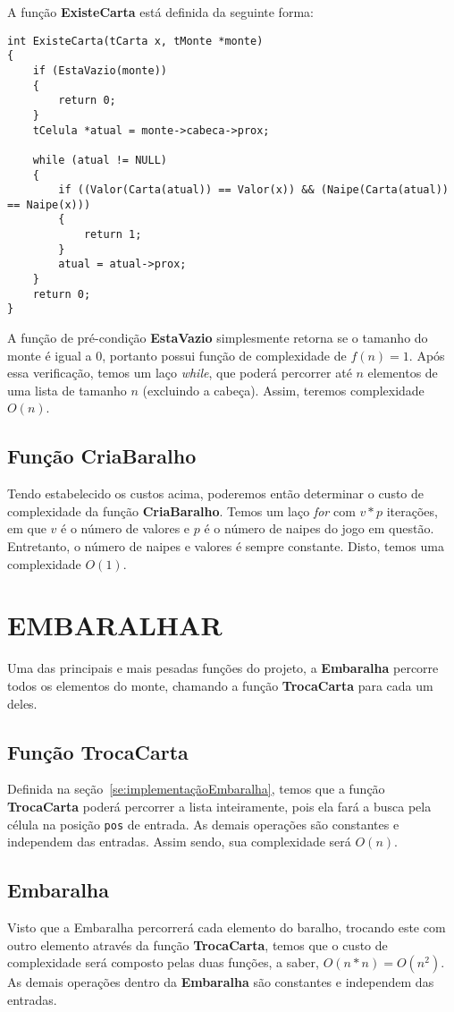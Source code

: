 \documentclass[12pt, oneside, a4paper, brazil]{abntex2}
\begin{document}
A função \textbf{ExisteCarta} está definida da seguinte forma:
\begin{lstlisting}
int ExisteCarta(tCarta x, tMonte *monte)
{
    if (EstaVazio(monte))
    {
        return 0;
    }
    tCelula *atual = monte->cabeca->prox;

    while (atual != NULL)
    {
        if ((Valor(Carta(atual)) == Valor(x)) && (Naipe(Carta(atual)) == Naipe(x)))
        {
            return 1;
        }
        atual = atual->prox;
    }
    return 0;
}
\end{lstlisting}
A função de pré-condição \textbf{EstaVazio} simplesmente retorna se o tamanho do monte é igual a 0, portanto possui função de complexidade de $f(n) = 1$. Após essa verificação, temos um laço \textit{while}, que poderá percorrer até $n$ elementos de uma lista de tamanho $n$ (excluindo a cabeça). Assim, teremos complexidade $O(n)$.

\subsection{Função CriaBaralho}
Tendo estabelecido os custos acima, poderemos então determinar o custo de complexidade da função \textbf{CriaBaralho}.
Temos um laço \textit{for} com $v * p$ iterações, em que $v$ é o número de valores e $p$ é o número de naipes do jogo em questão. Entretanto, o número de naipes e valores é sempre constante. Disto, temos uma complexidade $O(1)$.

\section{EMBARALHAR}
Uma das principais e mais pesadas funções do projeto, a \textbf{Embaralha} percorre todos os elementos do monte, chamando a função \textbf{TrocaCarta} para cada um deles.

\subsection{Função TrocaCarta}
Definida na seção~\ref{se:implementaçãoEmbaralha}, temos que a função \textbf{TrocaCarta} poderá percorrer a lista inteiramente, pois ela fará a busca pela célula na posição \texttt{pos} de entrada. As demais operações são constantes e independem das entradas. Assim sendo, sua complexidade será $O(n)$.

\subsection{Embaralha}
Visto que a Embaralha percorrerá cada elemento do baralho, trocando este com outro elemento através da função \textbf{TrocaCarta}, temos que o custo de complexidade será composto pelas duas funções, a saber, $O(n * n) = O(n^2)$. As demais operações dentro da \textbf{Embaralha} são constantes e independem das entradas.
\end{document}

